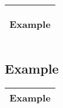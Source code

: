 \documentclass[12pt]{scrartcl}
\begin{document}
\newpage

\begin{tabularx}{\textwidth}{|X|}

	\hline
	\hypertarget{example:example}{Example} \\
	\hline

\end{tabularx}

\subsection{Example} \label{subsec:example}

\begin{tabular}{|l|}
	\hline
	Example \\
	\hline
\end{tabular}

\end{document}
